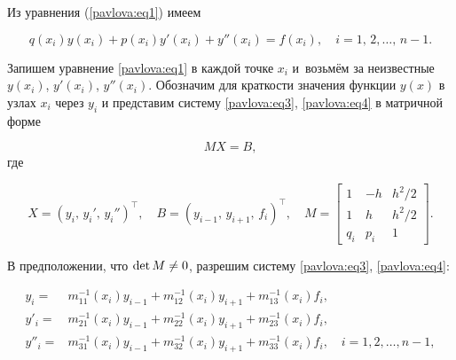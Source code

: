 Из уравнения (\ref{pavlova:eq1}) имеем

\begin{equation}

\label{pavlova:eq4}

q(x_i)y(x_i)+p(x_i)y'(x_i)+y''(x_i)=f(x_i),\quad

i=1,\,2,\ldots,\,n-1.

\end{equation}



Запишем уравнение \eqref{pavlova:eq1} в каждой точке $x_i$ и~возьмём за неизвестные $y(x_i)$, $y'(x_i)$, $y''(x_i)$. Обозначим для краткости значения функции $y(x)$ в узлах $x_i$ через $y_i$  и представим систему \eqref{pavlova:eq3}, \eqref{pavlova:eq4} в матричной форме

$$MX=B,$$ где

\begin{equation*}

\label{pavlova:eq5} X=(y_i,\,y_i',\,y_i'')^\top,\quad

B=(y_{i-1},\,y_{i+1},\,f_i)^\top, \quad  M=\begin{bmatrix}

 1  & -h  & {h^2}/{2}  \\

 1  & h   & {h^2}/{2}  \\

 q_i& p_i & 1

\end{bmatrix}.

\end{equation*}



В предположении, что $\mathop{\rm det} M \neq 0$, разрешим систему \eqref{pavlova:eq3}, \eqref{pavlova:eq4}:

\begin{equation}

\label{pavlova:eq6}

\begin{aligned}

y_i =& m_{11}^{-1} (x_i)y_{i-1} + m_{12}^{-1} (x_i )y_{i+1}

+m_{13}^{-1} (x_i)f_i, \\

y'_i =&m_{21}^{-1} (x_i)y_{i-1} + m_{22}^{-1} (x_i)y_{i+1}

+m_{23}^{-1}(x_i )f_i, \\

y''_i =& m_{31}^{-1} (x_i)y_{i-1} + m_{32}^{-1} (x_i) y_{i+1}

+m_{33}^{-1}(x_i)f_i, \quad i=1,2,\ldots,n-1,

\end{aligned}

\end{equation}

